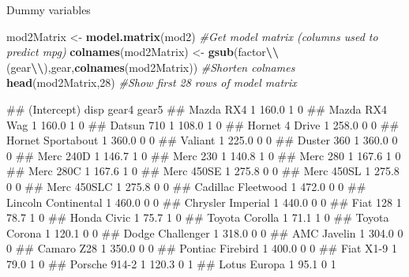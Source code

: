 \documentclass[
  ignorenonframetext,
  aspectratio=169]{beamer}
\newenvironment{Shaded}{\begin{snugshade}}{\end{snugshade}}
\newcommand{\CommentTok}[1]{\textcolor[rgb]{0.56,0.35,0.01}{\textit{#1}}}
\newcommand{\DecValTok}[1]{\textcolor[rgb]{0.00,0.00,0.81}{#1}}
\newcommand{\FunctionTok}[1]{\textcolor[rgb]{0.13,0.29,0.53}{\textbf{#1}}}
\newcommand{\NormalTok}[1]{#1}
\newcommand{\OtherTok}[1]{\textcolor[rgb]{0.56,0.35,0.01}{#1}}
\newcommand{\SpecialCharTok}[1]{\textcolor[rgb]{0.81,0.36,0.00}{\textbf{#1}}}
\newcommand{\StringTok}[1]{\textcolor[rgb]{0.31,0.60,0.02}{#1}}
\let\oldShaded\Shaded %
\let\endoldShaded\endShaded
\renewenvironment{Shaded}{\scriptsize\oldShaded}{\endoldShaded}
\let\oldverbatim\verbatim %
\let\endoldverbatim\endverbatim
\renewenvironment{verbatim}{\tiny\oldverbatim}{\endoldverbatim}
\begin{document}
\begin{frame}[fragile]{Dummy variables}
\protect\hypertarget{dummy-variables-1}{}
\tiny

\begin{Shaded}
\begin{Highlighting}[]
\NormalTok{mod2Matrix }\OtherTok{\textless{}{-}} \FunctionTok{model.matrix}\NormalTok{(mod2) }\CommentTok{\#Get model matrix (columns used to predict mpg)}
\FunctionTok{colnames}\NormalTok{(mod2Matrix) }\OtherTok{\textless{}{-}} \FunctionTok{gsub}\NormalTok{(}\StringTok{\textquotesingle{}factor}\SpecialCharTok{\textbackslash{}\textbackslash{}}\StringTok{(gear}\SpecialCharTok{\textbackslash{}\textbackslash{}}\StringTok{)\textquotesingle{}}\NormalTok{,}\StringTok{\textquotesingle{}gear\textquotesingle{}}\NormalTok{,}\FunctionTok{colnames}\NormalTok{(mod2Matrix)) }\CommentTok{\#Shorten colnames}
\FunctionTok{head}\NormalTok{(mod2Matrix,}\DecValTok{28}\NormalTok{) }\CommentTok{\#Show first 28 rows of model matrix}
\end{Highlighting}
\end{Shaded}

\begin{verbatim}
##                     (Intercept)  disp gear4 gear5
## Mazda RX4                     1 160.0     1     0
## Mazda RX4 Wag                 1 160.0     1     0
## Datsun 710                    1 108.0     1     0
## Hornet 4 Drive                1 258.0     0     0
## Hornet Sportabout             1 360.0     0     0
## Valiant                       1 225.0     0     0
## Duster 360                    1 360.0     0     0
## Merc 240D                     1 146.7     1     0
## Merc 230                      1 140.8     1     0
## Merc 280                      1 167.6     1     0
## Merc 280C                     1 167.6     1     0
## Merc 450SE                    1 275.8     0     0
## Merc 450SL                    1 275.8     0     0
## Merc 450SLC                   1 275.8     0     0
## Cadillac Fleetwood            1 472.0     0     0
## Lincoln Continental           1 460.0     0     0
## Chrysler Imperial             1 440.0     0     0
## Fiat 128                      1  78.7     1     0
## Honda Civic                   1  75.7     1     0
## Toyota Corolla                1  71.1     1     0
## Toyota Corona                 1 120.1     0     0
## Dodge Challenger              1 318.0     0     0
## AMC Javelin                   1 304.0     0     0
## Camaro Z28                    1 350.0     0     0
## Pontiac Firebird              1 400.0     0     0
## Fiat X1-9                     1  79.0     1     0
## Porsche 914-2                 1 120.3     0     1
## Lotus Europa                  1  95.1     0     1
\end{verbatim}
\end{frame}
\end{document}
